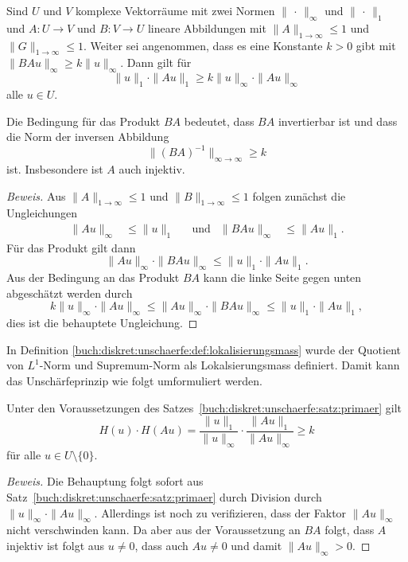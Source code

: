 \begin{satz}
\label{buch:diskret:unschaerfe:satz:primaer}
Sind $U$ und $V$ komplexe Vektorräume mit zwei Normen $\|\,\cdot\,\|_\infty$
und $\|\,\cdot\,\|_1$ und $A\colon U\to V$ und $B\colon V\to U$ lineare
Abbildungen mit $\|A\|_{1\to\infty}\le 1$ und $\|G\|_{1\to\infty}\le 1$.
Weiter sei angenommen, dass es eine Konstante $k>0$ gibt mit
$\|BAu\|_\infty \ge k\|u\|_\infty$.
Dann gilt für
\[
\|u\|_1\cdot \|Au\|_1 \ge k\|u\|_\infty\cdot \|Au\|_\infty
\]
alle $u\in U$.
\end{satz}

Die Bedingung für das Produkt $BA$ bedeutet, dass $BA$ invertierbar ist
und dass die Norm der inversen Abbildung
\[
\|(BA)^{-1}\|_{\infty\to\infty}
\ge k
\]
ist.
Insbesondere ist $A$ auch injektiv.

\begin{proof}[Beweis]
Aus $\|A\|_{1\to\infty}\le 1$ und $\|B\|_{1\to\infty}\le 1$ folgen
zunächst die Ungleichungen
\begin{align*}
\|Au\|_\infty &\le \|u\|_1
&&\text{und}&
\|BAu\|_\infty &\le \|Au\|_1.
\end{align*}
Für das Produkt gilt dann
\[
\|Au\|_\infty
\cdot
\|BAu\|_\infty
\le
\|u\|_1
\cdot
\|Au\|_1.
\]
Aus der Bedingung an das Produkt $BA$ kann die linke Seite gegen unten
abgeschätzt werden durch
\[
k\|u\|_\infty
\cdot
\|Au\|_\infty
\le
\|Au\|_\infty
\cdot
\|BAu\|_\infty
\le
\|u\|_1
\cdot
\|Au\|_1,
\]
dies ist die behauptete Ungleichung.
\end{proof}

In Definition \ref{buch:diskret:unschaerfe:def:lokalisierungsmass}
wurde der Quotient von $L^1$-Norm und Supremum-Norm als
Lokalsierungsmass definiert.
Damit kann das Unschärfeprinzip wie folgt umformuliert werden.

\begin{satz}
Unter den Voraussetzungen des
Satzes~\ref{buch:diskret:unschaerfe:satz:primaer}
gilt
\[
H(u)\cdot H(Au)
=
\frac{\|u\|_1}{\|u\|_\infty}
\cdot
\frac{\|Au\|_1}{\|Au\|_\infty}
\ge k
\]
für alle $u\in U\setminus\{0\}$.
\end{satz}

\begin{proof}[Beweis]
Die Behauptung folgt sofort aus Satz~\ref{buch:diskret:unschaerfe:satz:primaer}
durch Division durch $\|u\|_\infty\cdot \|Au\|_\infty$.
Allerdings ist noch zu verifizieren, dass der Faktor $\|Au\|_\infty$
nicht verschwinden kann.
Da aber aus der Voraussetzung an $BA$ folgt, dass $A$ injektiv ist
folgt aus $u\ne 0$, dass auch $Au\ne 0$ und damit $\|Au\|_\infty> 0$.
\end{proof}

